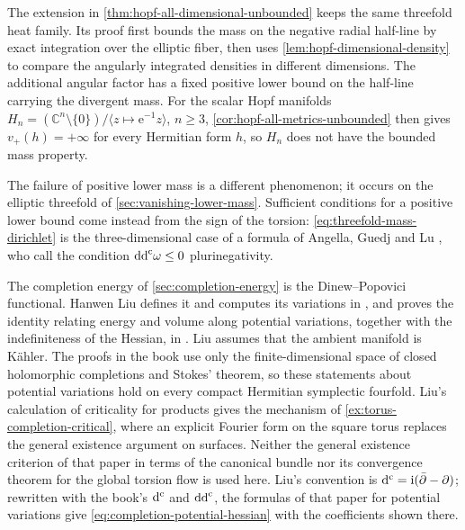 \label{hist:hopf-all-dimensional-density}
The extension in \cref{thm:hopf-all-dimensional-unbounded} keeps the same threefold heat family. Its proof first bounds the mass on the negative radial half-line by exact integration over the elliptic fiber, then uses \cref{lem:hopf-dimensional-density} to compare the angularly integrated densities in different dimensions. The additional angular factor has a fixed positive lower bound on the half-line carrying the divergent mass. For the scalar Hopf manifolds $H_n=(\mathbb C^n\setminus\{0\})/\langle z\mapsto\mathrm e^{-1}z\rangle$, $n\geq3$, \cref{cor:hopf-all-metrics-unbounded} then gives $v_+(h)=+\infty$ for every Hermitian form $h$, so $H_n$ does not have the bounded mass property.

The failure of positive lower mass is a different phenomenon; it occurs on the elliptic threefold of \cref{sec:vanishing-lower-mass}. Sufficient conditions for a positive lower bound come instead from the sign of the torsion: \eqref{eq:threefold-mass-dirichlet} is the three-dimensional case of a formula of Angella, Guedj and Lu \cite[proof of Theorem~3.2, p.~4641]{AGL23}, who call the condition $\mathrm{dd}^{\mathrm{c}}\omega\leq0$ plurinegativity.

The completion energy of \cref{sec:completion-energy} is the Dinew--Popovici functional. Hanwen Liu defines it and computes its variations in \cite[v1, Section~2.1, pp.~3--5]{LiuCritical26}, and proves the identity relating energy and volume along potential variations, together with the indefiniteness of the Hessian, in \cite[v1, Theorems~5.1--5.2, pp.~16--19]{LiuCritical26}. Liu assumes that the ambient manifold is K\"ahler. The proofs in the book use only the finite-dimensional space of closed holomorphic completions and Stokes' theorem, so these statements about potential variations hold on every compact Hermitian symplectic fourfold. Liu's calculation of criticality for products \cite[v1, Lemma~2.3 and Theorem~2.4, pp.~7--9]{LiuCritical26} gives the mechanism of \cref{ex:torus-completion-critical}, where an explicit Fourier form on the square torus replaces the general existence argument on surfaces. Neither the general existence criterion of that paper in terms of the canonical bundle nor its convergence theorem for the global torsion flow is used here. Liu's convention is $\mathrm d^{\mathrm c}=\mathrm i(\bar\partial-\partial)$; rewritten with the book's $\mathrm d^{\mathrm c}$ and $\mathrm{dd}^{\mathrm{c}}$, the formulas of that paper for potential variations give \eqref{eq:completion-potential-hessian} with the coefficients shown there.

